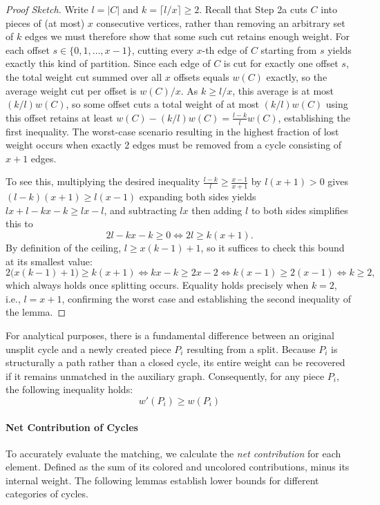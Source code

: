 \begin{proof}[Proof Sketch]
Write $l = |C|$ and $k = \lceil l/x \rceil \ge 2$. Recall that Step 2a cuts $C$
into pieces of (at most) $x$ consecutive vertices, rather than removing an
arbitrary set of $k$ edges we must therefore show that some such cut retains
enough weight. For each offset $s \in \{0, 1, \dots, x-1\}$, cutting every
$x$-th edge of $C$ starting from $s$ yields exactly this kind of partition.
Since each edge of $C$ is cut for exactly one offset $s$, the total weight cut
summed over all $x$ offsets equals $w(C)$ exactly, so the average weight cut per
offset is $w(C)/x$. As $k \ge l/x$, this average is at most $(k/l)w(C)$, so some
offset cuts a total weight of at most $(k/l)w(C)$ using this offset retains at
least $w(C) - (k/l)w(C) = \frac{l-k}{l}w(C)$, establishing the first inequality.
The worst-case scenario resulting in the highest fraction of lost weight occurs
when exactly 2 edges must be removed from a cycle consisting of $x + 1$ edges.

To see this, multiplying the desired inequality $\frac{l-k}{l} \ge
\frac{x-1}{x+1}$ by $l(x+1) > 0$ gives $(l-k)(x+1) \ge l(x-1)$ expanding both
sides yields $lx+l-kx-k \ge lx-l$, and subtracting $lx$ then adding $l$ to both
sides simplifies this to
$$ 2l - kx - k \ge 0 \iff 2l \ge k(x+1). $$
By definition of the ceiling, $l \ge x(k-1) + 1$, so it suffices to check this
bound at its smallest value:
$$ 2\big(x(k-1)+1\big) \ge k(x+1) \iff kx - k \ge 2x - 2 \iff k(x-1) \ge 2(x-1)
\iff k \ge 2, $$
which always holds once splitting occurs. Equality holds precisely when $k=2$,
i.e., $l = x+1$, confirming the worst case and establishing the second
inequality of the lemma.
\end{proof}

For analytical purposes, there is a fundamental difference between an original
unsplit cycle and a newly created piece $P_i$ resulting from a split. Because
$P_i$ is structurally a path rather than a closed cycle, its entire weight can
be recovered if it remains unmatched in the auxiliary graph. Consequently, for
any piece $P_i$, the following inequality holds:
\begin{equation} \label{eq:piece_weight}
w'(P_i) \ge w(P_i)
\end{equation}

\paragraph{Net Contribution of Cycles}
To accurately evaluate the matching, we calculate the \textit{net contribution}
for each element. Defined as the sum of its colored and uncolored contributions,
minus its internal weight. The following lemmas establish lower bounds for
different categories of cycles.

